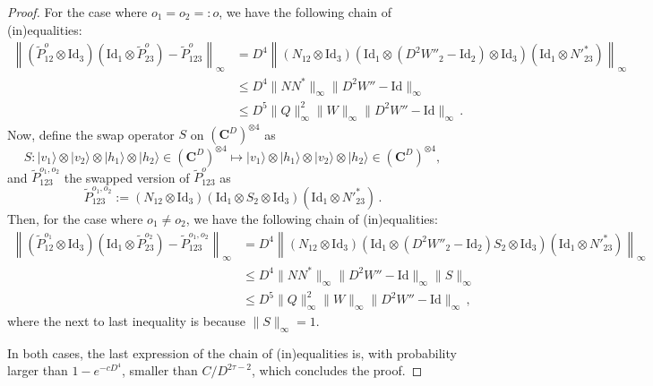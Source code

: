 \documentclass{amsart}
\newcommand{\C}{\mathbf{C}}
\renewcommand{\leq}{\leqslant}
\newcommand{\Id}{\mathrm{Id}}
\newcommand{\ket}[1]{| #1 \rangle}
\begin{document}
\begin{proof}
    For the case where $o_1=o_2=:o$, we have the following chain of (in)equalities:
    \begin{align*}
        \left\| \left(\widetilde{P}_{12}^{o}\otimes\Id_3\right)\left(\Id_1\otimes\widetilde{P}_{23}^{o}\right) - \widetilde{P}_{123}^{o} \right\|_{\infty} & = D^4 \left\| (N_{12}\otimes\Id_3)(\Id_1\otimes (D^2W''_2-\Id_2)\otimes\Id_3)(\Id_1\otimes N'^*_{23}) \right\|_{\infty} \\
                                                                                                                                                           & \leq D^4 \|NN^*\|_{\infty} \|D^2W''-\Id\|_{\infty}                                                                      \\
                                                                                                                                                           & \leq D^5 \|Q\|_{\infty}^2 \|W\|_{\infty} \|D^2W''-\Id\|_{\infty} \, .
    \end{align*}
    Now, define the swap operator $S$ on $(\C^D)^{\otimes 4}$ as
    \[ S:\ket{v_1}\otimes\ket{v_2}\otimes\ket{h_1}\otimes\ket{h_2} \in (\C^D)^{\otimes 4} \mapsto \ket{v_1}\otimes\ket{h_1}\otimes\ket{v_2}\otimes\ket{h_2} \in (\C^D)^{\otimes 4}, \]
    and $\widetilde{P}_{123}^{o_1,o_2}$ the swapped version of $\widetilde{P}_{123}^{o}$ as
    \[ \widetilde{P}_{123}^{o_1,o_2} := (N_{12}\otimes\Id_3)(\Id_1\otimes S_2\otimes\Id_3)(\Id_1\otimes N'^*_{23}) \, . \]
    Then, for the case where $o_1\neq o_2$, we have the following chain of (in)equalities:
    \begin{align*}
        \left\| \left(\widetilde{P}_{12}^{o_1}\otimes\Id_3\right)\left(\Id_1\otimes\widetilde{P}_{23}^{o_2}\right) - \widetilde{P}_{123}^{o_1,o_2} \right\|_{\infty} & = D^4 \left\| (N_{12}\otimes\Id_3)(\Id_1\otimes (D^2W''_2-\Id_2)S_2\otimes\Id_3)(\Id_1\otimes N'^*_{23}) \right\|_{\infty} \\
                                                                                                                                                                     & \leq D^4 \|NN^*\|_{\infty} \|D^2W''-\Id\|_{\infty}\|S\|_{\infty}                                                           \\
                                                                                                                                                                     & \leq D^5 \|Q\|_{\infty}^2 \|W\|_{\infty} \|D^2W''-\Id\|_{\infty} \, ,
    \end{align*}
    where the next to last inequality is because $\|S\|_\infty=1$.

    In both cases, the last expression of the chain of (in)equalities is, with probability larger than $1-e^{-cD^4}$, smaller than $C/D^{2\tau -2}$, which concludes the proof.
\end{proof}
\end{document}

